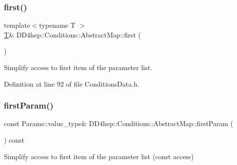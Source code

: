 \hypertarget{class_d_d4hep_1_1_conditions_1_1_abstract_map_a8f1ca773617130ea41d6f4406862d560}{}\label{class_d_d4hep_1_1_conditions_1_1_abstract_map_a8f1ca773617130ea41d6f4406862d560} 
\subsubsection{\texorpdfstring{first()}{first()}\hspace{0.1cm}{\footnotesize\ttfamily [2/2]}}
{\footnotesize\ttfamily template$<$typename T $>$ \\
\hyperlink{class_t}{T}\& D\+D4hep\+::\+Conditions\+::\+Abstract\+Map\+::first (\begin{DoxyParamCaption}{ }\end{DoxyParamCaption})\hspace{0.3cm}{\ttfamily [inline]}}



Simplify access to first item of the parameter list. 



Definition at line 92 of file Conditions\+Data.\+h.

\hypertarget{class_d_d4hep_1_1_conditions_1_1_abstract_map_a0a92ec7fb886bc1809b560f9a63a4dda}{}\label{class_d_d4hep_1_1_conditions_1_1_abstract_map_a0a92ec7fb886bc1809b560f9a63a4dda} 
\subsubsection{\texorpdfstring{first\+Param()}{firstParam()}\hspace{0.1cm}{\footnotesize\ttfamily [1/2]}}
{\footnotesize\ttfamily const Params\+::value\+\_\+type\& D\+D4hep\+::\+Conditions\+::\+Abstract\+Map\+::first\+Param (\begin{DoxyParamCaption}{ }\end{DoxyParamCaption}) const\hspace{0.3cm}{\ttfamily [inline]}}



Simplify access to first item of the parameter list (const access) 



